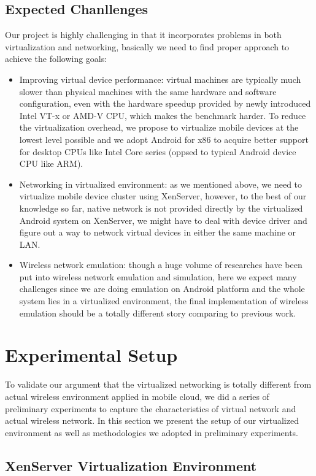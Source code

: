 \documentclass[journal,comsoc]{IEEEtran}
\begin{document}
\subsection{Expected Chanllenges}
Our project is highly challenging in that it incorporates problems in both virtualization and networking, basically we need to find proper approach to achieve the following goals:
\begin{itemize}
	\item Improving virtual device performance: virtual machines are typically much slower than physical machines with the same hardware and software configuration, even with the hardware speedup provided by newly introduced Intel VT-x or AMD-V CPU, which makes the benchmark harder. To reduce the virtualization overhead, we propose to virtualize mobile devices at the lowest level possible and we adopt Android for x86 to acquire better support for desktop CPUs like Intel Core series (oppsed to typical Android device CPU like ARM).
	\item Networking in virtualized environment: as we mentioned above, we need to virtualize mobile device cluster using XenServer, however, to the best of our knowledge so far, native network is not provided directly by the virtualized Android system on XenServer, we might have to deal with device driver and figure out a way to network virtual devices in either the same machine or LAN.
	\item Wireless network emulation: though a huge volume of researches have been put into wireless network emulation and simulation, here we expect many challenges since we are doing emulation on Android platform and the whole system lies in a virtualized environment, the final implementation of wireless emulation should be a totally different story comparing to previous work.
\end{itemize}

\section{Experimental Setup}
To validate our argument that the virtualized networking is totally different from actual wireless environment applied in mobile cloud, we did a series of preliminary experiments to capture the characteristics of virtual network and actual wireless network. In this section we present the setup of our virtualized environment as well as methodologies we adopted in preliminary experiments.
\subsection{XenServer Virtualization Environment}
\end{document}
